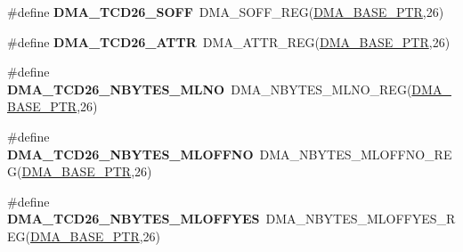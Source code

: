 \begin{DoxyCompactItemize}
\item 
\hypertarget{group___d_m_a___register___accessor___macros_ga8eb8024f4420abcd41a089aa6bb571ad}{}\#define {\bfseries D\+M\+A\+\_\+\+T\+C\+D26\+\_\+\+S\+O\+F\+F}~D\+M\+A\+\_\+\+S\+O\+F\+F\+\_\+\+R\+E\+G(\hyperlink{group___d_m_a___peripheral_ga6997fbc1b1973e9f27170217a3bd6f22}{D\+M\+A\+\_\+\+B\+A\+S\+E\+\_\+\+P\+T\+R},26)\label{group___d_m_a___register___accessor___macros_ga8eb8024f4420abcd41a089aa6bb571ad}

\item 
\hypertarget{group___d_m_a___register___accessor___macros_gaf9737c858752253664f629b65553082f}{}\#define {\bfseries D\+M\+A\+\_\+\+T\+C\+D26\+\_\+\+A\+T\+T\+R}~D\+M\+A\+\_\+\+A\+T\+T\+R\+\_\+\+R\+E\+G(\hyperlink{group___d_m_a___peripheral_ga6997fbc1b1973e9f27170217a3bd6f22}{D\+M\+A\+\_\+\+B\+A\+S\+E\+\_\+\+P\+T\+R},26)\label{group___d_m_a___register___accessor___macros_gaf9737c858752253664f629b65553082f}

\item 
\hypertarget{group___d_m_a___register___accessor___macros_ga9578f423e0cdcf02192c3edcf7f3be3c}{}\#define {\bfseries D\+M\+A\+\_\+\+T\+C\+D26\+\_\+\+N\+B\+Y\+T\+E\+S\+\_\+\+M\+L\+N\+O}~D\+M\+A\+\_\+\+N\+B\+Y\+T\+E\+S\+\_\+\+M\+L\+N\+O\+\_\+\+R\+E\+G(\hyperlink{group___d_m_a___peripheral_ga6997fbc1b1973e9f27170217a3bd6f22}{D\+M\+A\+\_\+\+B\+A\+S\+E\+\_\+\+P\+T\+R},26)\label{group___d_m_a___register___accessor___macros_ga9578f423e0cdcf02192c3edcf7f3be3c}

\item 
\hypertarget{group___d_m_a___register___accessor___macros_ga0904068cf1a9790afe9307cae362b190}{}\#define {\bfseries D\+M\+A\+\_\+\+T\+C\+D26\+\_\+\+N\+B\+Y\+T\+E\+S\+\_\+\+M\+L\+O\+F\+F\+N\+O}~D\+M\+A\+\_\+\+N\+B\+Y\+T\+E\+S\+\_\+\+M\+L\+O\+F\+F\+N\+O\+\_\+\+R\+E\+G(\hyperlink{group___d_m_a___peripheral_ga6997fbc1b1973e9f27170217a3bd6f22}{D\+M\+A\+\_\+\+B\+A\+S\+E\+\_\+\+P\+T\+R},26)\label{group___d_m_a___register___accessor___macros_ga0904068cf1a9790afe9307cae362b190}

\item 
\hypertarget{group___d_m_a___register___accessor___macros_gaa7e8fc15cbc57957405926a69a71791d}{}\#define {\bfseries D\+M\+A\+\_\+\+T\+C\+D26\+\_\+\+N\+B\+Y\+T\+E\+S\+\_\+\+M\+L\+O\+F\+F\+Y\+E\+S}~D\+M\+A\+\_\+\+N\+B\+Y\+T\+E\+S\+\_\+\+M\+L\+O\+F\+F\+Y\+E\+S\+\_\+\+R\+E\+G(\hyperlink{group___d_m_a___peripheral_ga6997fbc1b1973e9f27170217a3bd6f22}{D\+M\+A\+\_\+\+B\+A\+S\+E\+\_\+\+P\+T\+R},26)\label{group___d_m_a___register___accessor___macros_gaa7e8fc15cbc57957405926a69a71791d}


\end{DoxyCompactItemize}
